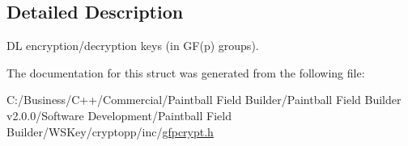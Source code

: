 \subsection{Detailed Description}
DL encryption/decryption keys (in GF(p) groups). 

The documentation for this struct was generated from the following file:\begin{DoxyCompactItemize}
\item 
C:/Business/C++/Commercial/Paintball Field Builder/Paintball Field Builder v2.0.0/Software Development/Paintball Field Builder/WSKey/cryptopp/inc/\hyperlink{gfpcrypt_8h}{gfpcrypt.h}\end{DoxyCompactItemize}
